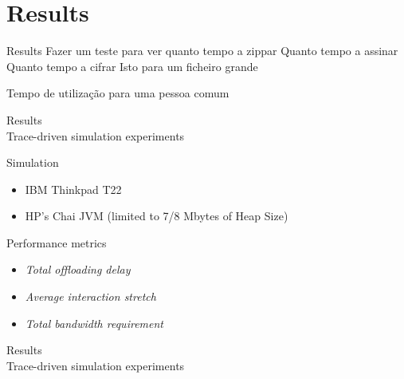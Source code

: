 
\section{Results}
\begin{frame}{Results}
Fazer um teste para ver quanto tempo a zippar
Quanto tempo a assinar
Quanto tempo a cifrar
Isto para um ficheiro grande


Tempo de utilização para uma pessoa comum	

	
\end{frame}

\begin{frame}{Results \\ \small Trace-driven simulation experiments}

\begin{block}{Simulation}
\begin{itemize}
\item IBM Thinkpad T22
\item HP's Chai JVM (limited to 7/8 Mbytes of Heap Size)
\end{itemize}
\end{block}	

\begin{block}{Performance metrics}
\begin{itemize}
\item \textit{Total offloading delay}
\item \textit{Average interaction stretch}
\item \textit{Total bandwidth requirement}
\end{itemize}
\end{block}	
\end{frame}

\begin{frame}{Results \\ \small Trace-driven simulation experiments}


\end{frame}

